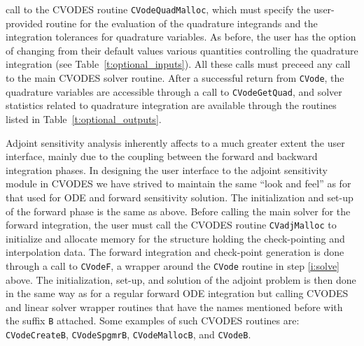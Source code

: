 call to the CVODES routine {\tt CVodeQuadMalloc}, which must specify the
user-provided routine for the evaluation of the quadrature integrands and
the integration tolerances for quadrature variables. As before, the user
has the option of changing from their default values various quantities
controlling the quadrature integration (see Table~\ref{t:optional_inputs}).
All these calls must preceed any call to the main CVODES solver routine.
After a successful return from {\tt CVode}, the quadrature variables are
accessible through a call to {\tt CVodeGetQuad}, and solver statistics related
to quadrature integration are available through the routines listed in
Table~\ref{t:optional_outputs}.

%
Adjoint sensitivity analysis inherently affects to a much greater extent the 
user interface, mainly due to the coupling between the forward and backward 
integration phases. 
%
In designing the user interface to the adjoint sensitivity module in CVODES we 
have strived to maintain the same ``look and feel'' as for that used for
ODE and forward sensitivity solution.
The initialization and set-up of the forward phase is the same as above.
Before calling the main solver for the forward integration, the user must 
call the CVODES routine {\tt CVadjMalloc} to initialize and allocate memory 
for the structure holding the check-pointing and interpolation data.
The forward integration and check-point generation is done through a call
to {\tt CVodeF}, a wrapper around the {\tt CVode} routine in step 
\ref{i:solve} above.
%
The initialization, set-up, and solution of the adjoint problem is then
done in the same way as for a regular forward ODE integration but
calling CVODES and linear solver wrapper routines that have the names 
mentioned before with the suffix {\tt B} attached. Some examples of such
CVODES routines are: {\tt CVodeCreateB}, {\tt CVodeSpgmrB}, {\tt CVodeMallocB},
and {\tt CVodeB}.

